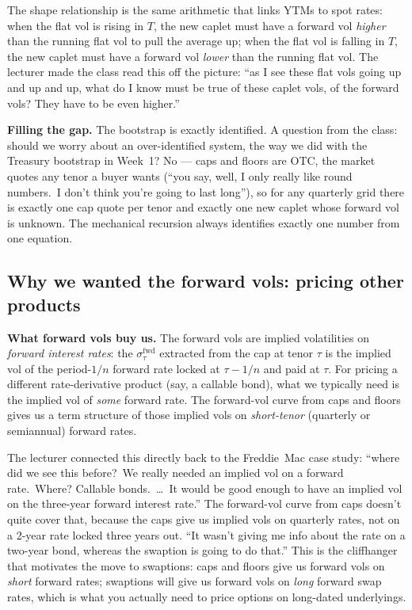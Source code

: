 The shape relationship is the same arithmetic that links YTMs to spot
rates: when the flat vol is rising in $T$, the new caplet must have a
forward vol \emph{higher} than the running flat vol to pull the
average up; when the flat vol is falling in $T$, the new caplet must
have a forward vol \emph{lower} than the running flat vol. The
lecturer made the class read this off the picture: ``as I see these
flat vols going up and up and up, what do I know must be true of
these caplet vols, of the forward vols? They have to be even higher.''

\begin{tipblock}
\textbf{Filling the gap.} The bootstrap is exactly identified. A
question from the class: should we worry about an over-identified
system, the way we did with the Treasury bootstrap in Week~1? No ---
caps and floors are OTC, the market quotes any tenor a buyer wants
(``you say, well, I only really like round numbers.\ I don't think
you're going to last long''), so for any quarterly grid there is
exactly one cap quote per tenor and exactly one new caplet whose
forward vol is unknown. The mechanical recursion always identifies
exactly one number from one equation.
\end{tipblock}

\subsection{Why we wanted the forward vols: pricing other
products}\label{L6-sec:why-fwdvol}

\begin{keyblock}
\textbf{What forward vols buy us.}
The forward vols are implied volatilities on \emph{forward interest
rates}: the $\sigma^{\text{fwd}}_{\tau}$ extracted from the cap at
tenor $\tau$ is the implied vol of the period-$1/n$ forward rate
locked at $\tau - 1/n$ and paid at $\tau$.
For pricing a different rate-derivative product (say, a callable
bond), what we typically need is the implied vol of \emph{some}
forward rate. The forward-vol curve from caps and floors gives us
a term structure of those implied vols on \emph{short-tenor}
(quarterly or semiannual) forward rates.
\end{keyblock}

The lecturer connected this directly back to the Freddie~Mac case
study: ``where did we see this before?\ We really needed an implied
vol on a forward rate.\ Where? Callable bonds.\ \ldots\ It would be
good enough to have an implied vol on the three-year forward interest
rate.''
The forward-vol curve from caps doesn't quite cover that, because the
caps give us implied vols on quarterly rates, not on a 2-year rate
locked three years out. ``It wasn't giving me info about the rate on
a two-year bond, whereas the swaption is going to do that.''
This is the cliffhanger that motivates the move to swaptions: caps
and floors give us forward vols on \emph{short} forward rates;
swaptions will give us forward vols on \emph{long} forward swap
rates, which is what you actually need to price options on long-dated
underlyings.

